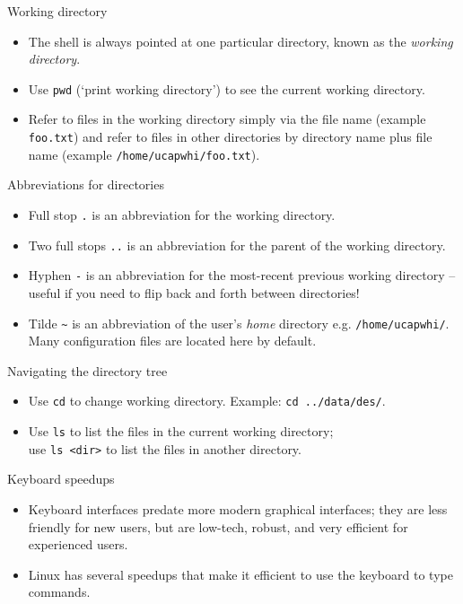 \documentclass[dvipsnames]{beamer}
\newcommand{\command}[1]{\colorbox{light-gray}{\texttt{#1}}}
\newcommand{\filename}[1]{\colorbox{light-green}{\texttt{#1}}}
\begin{document}
\begin{frame}{Working directory}
  \begin{itemize}
    \item The shell is always pointed at one particular directory, known as the \textit{working directory}.
    \item Use \command{pwd} (`print working directory') to see the current working directory.
    \item Refer to files in the working directory simply via the file name (example \filename{foo.txt}) and refer to files in other directories by directory name plus file name (example \filename{/home/ucapwhi/foo.txt}).
  \end{itemize}
\end{frame}


\begin{frame}{Abbreviations for directories}
  \begin{itemize}
    \item Full stop \filename{.} is an abbreviation for the working directory.
    \item Two full stops \filename{..} is an abbreviation for the parent of the working directory.
    \item Hyphen \filename{-} is an abbreviation for the most-recent previous working directory -- useful if you need to flip back and forth between directories!
    \item Tilde \filename{\textasciitilde} is an abbreviation of the user's \textit{home} directory e.g. \filename{/home/ucapwhi/}. Many configuration files are located here by default.
  \end{itemize}
\end{frame}


\begin{frame}{Navigating the directory tree}
  \begin{itemize}
    \item Use \command{cd} to change working directory. Example: \command{cd ../data/des/}.
    \item Use \command{ls} to list the files in the current working directory; \\use \command{ls <dir>} to list the files in another directory.
  \end{itemize}
\end{frame}


\begin{frame}{Keyboard speedups}
  \begin{itemize}
    \item Keyboard interfaces predate more modern graphical interfaces; they are less friendly for new users, but are low-tech, robust, and very efficient for experienced users.
    \item Linux has several speedups that make it efficient to use the keyboard to type commands.
  \end{itemize}
\end{frame}
\end{document}
